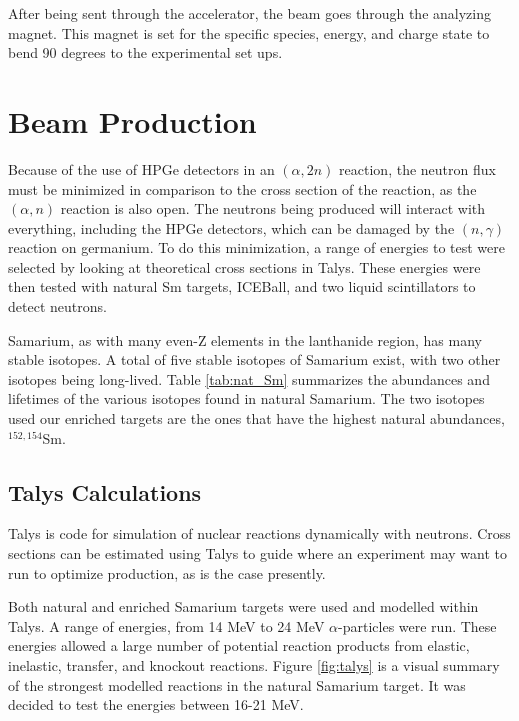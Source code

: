 

After being sent through the accelerator, the beam goes through the analyzing magnet. This magnet is set for the specific species, energy, and charge state to bend 90 degrees to the experimental set ups.

\section{Beam Production}

Because of the use of HPGe detectors in an $(\alpha,2n)$ reaction, the neutron flux must be minimized in comparison to the cross section of the reaction, as the $(\alpha,n)$ reaction is also open. The neutrons being produced will interact with everything, including the HPGe detectors, which can be damaged by the $(n,\gamma)$ reaction on germanium. To do this minimization, a range of energies to test were selected by looking at theoretical cross sections in Talys\citep{koning07:_talys}. These energies were then tested with natural Sm targets, ICEBall, and two liquid scintillators to detect neutrons.

Samarium, as with many even-Z elements in the lanthanide region, has many stable isotopes. A total of five stable isotopes of Samarium exist, with two other isotopes being long-lived. Table \ref{tab:nat_Sm} summarizes the abundances and lifetimes of the various isotopes found in natural Samarium. The two isotopes used our enriched targets are the ones that have the highest natural abundances, $^{152,154}$Sm.



\subsection{Talys Calculations}

Talys \citep{koning07:_talys} is code for simulation of nuclear reactions dynamically with neutrons. Cross sections can be estimated using Talys to guide where an experiment may want to run to optimize production, as is the case presently. 

Both natural and enriched Samarium targets were used and modelled within Talys. A range of energies, from 14 MeV to 24 MeV $\alpha$-particles were run. These energies allowed a large number of potential reaction products from elastic, inelastic, transfer, and knockout reactions. Figure \ref{fig:talys} is a visual summary of the strongest modelled reactions in the natural Samarium target. It was decided to test the energies between 16-21 MeV.

